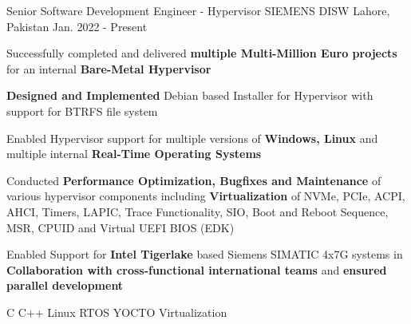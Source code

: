 

\begin{cventries}

  \cventry
    {Senior Software Development Engineer - Hypervisor} %
    {SIEMENS DISW} %
    {Lahore, Pakistan} %
    {Jan. 2022 - Present} %
    {
      \begin{cvitems} %
        \item Successfully completed and delivered \textbf{multiple Multi-Million Euro projects} for an internal \textbf{Bare-Metal Hypervisor}
        \item \textbf{Designed and Implemented} Debian based Installer for Hypervisor with support for BTRFS file system
        \item Enabled Hypervisor support for multiple versions of \textbf{Windows, Linux} and multiple internal \textbf{Real-Time Operating Systems}
        \item Conducted \textbf{Performance Optimization, Bugfixes and Maintenance} of various hypervisor components including \textbf{Virtualization} of NVMe, PCIe, ACPI, AHCI, Timers, LAPIC, Trace Functionality, SIO, Boot and Reboot Sequence, MSR, CPUID and Virtual UEFI BIOS (EDK)
        \item Enabled Support for \textbf{Intel Tigerlake} based Siemens SIMATIC 4x7G systems in \textbf{Collaboration with cross-functional international teams} and \textbf{ensured parallel development}
      \end{cvitems}
    }
    {C \acvSep C++ \acvSep Linux \acvSep RTOS \acvSep YOCTO \acvSep Virtualization}


\end{cventries}
